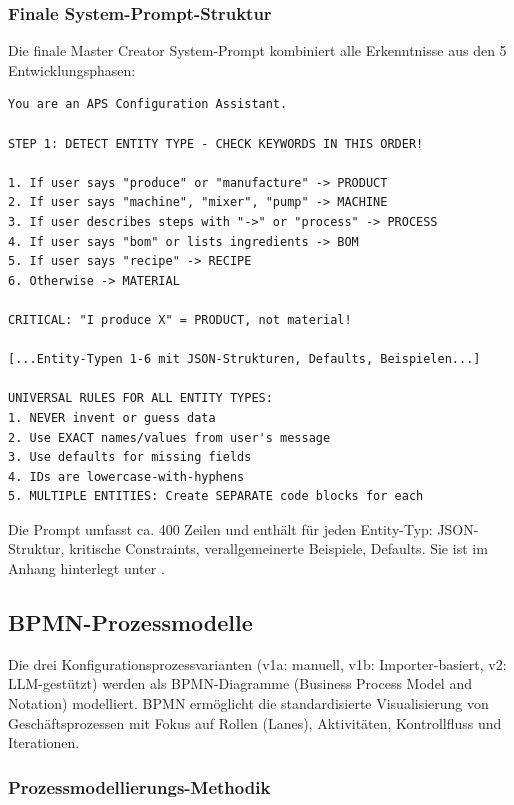 \subsubsection{Finale System-Prompt-Struktur}

Die finale Master Creator System-Prompt kombiniert alle Erkenntnisse aus den 5 Entwicklungsphasen:

\begin{verbatim}
You are an APS Configuration Assistant.

STEP 1: DETECT ENTITY TYPE - CHECK KEYWORDS IN THIS ORDER!

1. If user says "produce" or "manufacture" -> PRODUCT
2. If user says "machine", "mixer", "pump" -> MACHINE
3. If user describes steps with "->" or "process" -> PROCESS
4. If user says "bom" or lists ingredients -> BOM
5. If user says "recipe" -> RECIPE
6. Otherwise -> MATERIAL

CRITICAL: "I produce X" = PRODUCT, not material!

[...Entity-Typen 1-6 mit JSON-Strukturen, Defaults, Beispielen...]

UNIVERSAL RULES FOR ALL ENTITY TYPES:
1. NEVER invent or guess data
2. Use EXACT names/values from user's message
3. Use defaults for missing fields
4. IDs are lowercase-with-hyphens
5. MULTIPLE ENTITIES: Create SEPARATE code blocks for each
\end{verbatim}

\noindent Die Prompt umfasst ca. 400 Zeilen und enthält für jeden Entity-Typ: JSON-Struktur, kritische Constraints, verallgemeinerte Beispiele, Defaults. Sie ist im Anhang hinterlegt unter \cite{anhang:system_prompt}.


\subsection{BPMN-Prozessmodelle}
\label{sec:BPMN}

Die drei Konfigurationsprozessvarianten (v1a: manuell, v1b: Importer-basiert, v2: LLM-gestützt) werden als BPMN-Diagramme (Business Process Model and Notation) modelliert. BPMN ermöglicht die standardisierte Visualisierung von Geschäftsprozessen mit Fokus auf Rollen (Lanes), Aktivitäten, Kontrollfluss und Iterationen.

\subsubsection{Prozessmodellierungs-Methodik}

